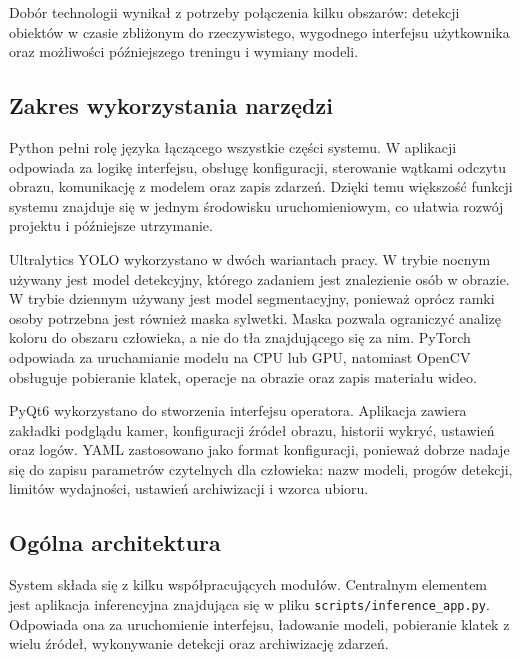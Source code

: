 Dobór technologii wynikał z potrzeby połączenia kilku obszarów: detekcji obiektów w czasie zbliżonym do rzeczywistego, wygodnego interfejsu użytkownika oraz możliwości późniejszego treningu i wymiany modeli.

\subsection{Zakres wykorzystania narzędzi}

Python pełni rolę języka łączącego wszystkie części systemu. W aplikacji odpowiada za logikę interfejsu, obsługę konfiguracji, sterowanie wątkami odczytu obrazu, komunikację z modelem oraz zapis zdarzeń. Dzięki temu większość funkcji systemu znajduje się w jednym środowisku uruchomieniowym, co ułatwia rozwój projektu i późniejsze utrzymanie.

Ultralytics YOLO wykorzystano w dwóch wariantach pracy. W trybie nocnym używany jest model detekcyjny, którego zadaniem jest znalezienie osób w obrazie. W trybie dziennym używany jest model segmentacyjny, ponieważ oprócz ramki osoby potrzebna jest również maska sylwetki. Maska pozwala ograniczyć analizę koloru do obszaru człowieka, a nie do tła znajdującego się za nim. PyTorch odpowiada za uruchamianie modelu na CPU lub GPU, natomiast OpenCV obsługuje pobieranie klatek, operacje na obrazie oraz zapis materiału wideo.

PyQt6 wykorzystano do stworzenia interfejsu operatora. Aplikacja zawiera zakładki podglądu kamer, konfiguracji źródeł obrazu, historii wykryć, ustawień oraz logów. YAML zastosowano jako format konfiguracji, ponieważ dobrze nadaje się do zapisu parametrów czytelnych dla człowieka: nazw modeli, progów detekcji, limitów wydajności, ustawień archiwizacji i wzorca ubioru.

\subsection{Ogólna architektura}

System składa się z kilku współpracujących modułów. Centralnym elementem jest aplikacja inferencyjna znajdująca się w pliku \texttt{scripts/inference\_app.py}. Odpowiada ona za uruchomienie interfejsu, ładowanie modeli, pobieranie klatek z wielu źródeł, wykonywanie detekcji oraz archiwizację zdarzeń.

